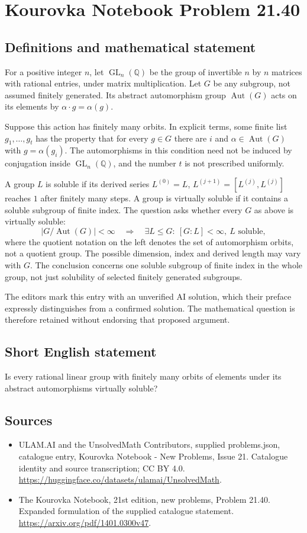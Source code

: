 \documentclass[11pt,a4paper]{article}
\begin{document}
\section*{Kourovka Notebook Problem 21.40}\label{statement}

\subsection{Definitions and mathematical statement}
For a positive integer $n$, let $\operatorname{GL}_n(\mathbb Q)$ be the
group of invertible $n$ by $n$ matrices with rational entries, under
matrix multiplication. Let $G$ be any subgroup, not assumed finitely
generated. Its abstract automorphism group $\operatorname{Aut}(G)$ acts
on its elements by $\alpha\cdot g=\alpha(g)$.

Suppose this action has finitely many orbits. In explicit terms, some
finite list $g_1,\ldots,g_t$ has the property that for every $g\in G$
there are $i$ and $\alpha\in\operatorname{Aut}(G)$ with $g=\alpha(g_i)$.
The automorphisms in this condition need not be induced by conjugation
inside $\operatorname{GL}_n(\mathbb Q)$, and the number $t$ is not
prescribed uniformly.

A group $L$ is soluble if its derived series $L^{(0)}=L$,
$L^{(j+1)}=[L^{(j)},L^{(j)}]$ reaches $1$ after finitely many steps.
A group is virtually soluble if it contains a soluble subgroup of
finite index. The question asks whether every $G$ as above is virtually
soluble:
\[
 |G/\operatorname{Aut}(G)|<\infty
 \quad\Longrightarrow\quad
 \exists L\le G:\ [G:L]<\infty,\ L\text{ soluble},
\]
where the quotient notation on the left denotes the set of automorphism
orbits, not a quotient group. The possible dimension, index and derived
length may vary with $G$. The conclusion concerns one soluble subgroup
of finite index in the whole group, not just solubility of selected
finitely generated subgroups.

The editors mark this entry with an unverified AI solution, which their
preface expressly distinguishes from a confirmed solution. The mathematical
question is therefore retained without endorsing that proposed argument.
\subsection{Short English statement}
Is every rational linear group with finitely many orbits of elements under its abstract automorphisms virtually soluble?
\subsection{Sources}
\begin{itemize}
\item[S1] ULAM.AI and the UnsolvedMath Contributors, supplied problems.json, catalogue entry, Kourovka Notebook - New Problems, Issue 21. Catalogue identity and source transcription; CC BY 4.0.
\url{https://huggingface.co/datasets/ulamai/UnsolvedMath}.
\item[S2] The Kourovka Notebook, 21st edition, new problems, Problem 21.40. Expanded formulation of the supplied catalogue statement.
\url{https://arxiv.org/pdf/1401.0300v47}.
\end{itemize}
\end{document}
